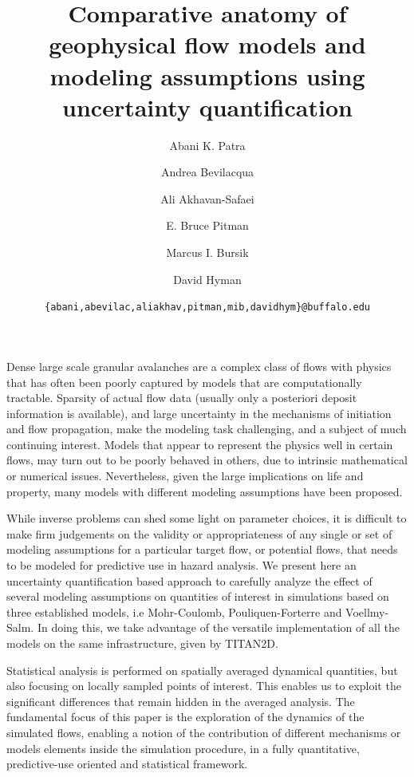 \documentclass{article}
\begin{document}
\title{\bf Comparative anatomy of geophysical flow models and modeling assumptions using uncertainty quantification}
\author[1,3]{Abani K. Patra}
\author[2]{Andrea Bevilacqua}
\author[1]{Ali Akhavan-Safaei}
\author[4]{E. Bruce Pitman}
\author[2]{Marcus I. Bursik}
\author[2]{David Hyman}


\date{\texttt{\{abani,abevilac,aliakhav,pitman,mib,davidhym\}@buffalo.edu}}


\maketitle
\tableofcontents

\abstract
Dense large scale granular avalanches are a complex class of flows with physics that has often been poorly captured by models that are computationally tractable. Sparsity of actual flow data (usually only a posteriori deposit information is available), and large uncertainty in the mechanisms of initiation and flow propagation, make the modeling task challenging, and a subject of much continuing interest. Models that appear to represent the physics well in certain flows, may turn out to be poorly behaved in others, due to intrinsic mathematical or numerical issues. Nevertheless, given the large implications on life and property, many models with different modeling assumptions have been proposed.

While inverse problems can shed some light on parameter choices, it is difficult to make firm judgements on the validity or appropriateness of any single or set of modeling assumptions for a particular target flow, or potential flows, that needs to be modeled for predictive use in hazard analysis. We present here an uncertainty quantification based approach to carefully analyze the effect of several modeling assumptions on quantities of interest in simulations based on three established models, i.e Mohr-Coulomb, Pouliquen-Forterre and Voellmy-Salm. In doing this, we take advantage of the versatile implementation of all the models on the same infrastructure, given by TITAN2D.

Statistical analysis is performed on spatially averaged dynamical quantities, but also focusing on locally sampled points of interest. This enables us to exploit the significant differences that remain hidden in the averaged analysis. The fundamental focus of this paper is the exploration of the dynamics of the simulated flows, enabling a notion of the contribution of different mechanisms or models elements inside the simulation procedure, in a fully quantitative, predictive-use oriented and statistical framework.
\end{document}
